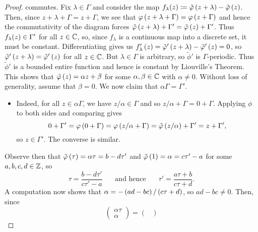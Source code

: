 \documentclass[../Moduli_Spaces_of_Riemann_Surfaces.tex]{subfiles}
\begin{document}
\begin{proof}
        commutes. Fix $\lambda\in\Gamma$ and consider the map $f_\lambda\!\left(z\right)\coloneqq\tilde{\varphi}\left(z+\lambda\right)-\tilde{\varphi}\left(z\right)$. Then, since $z+\lambda+\Gamma=z+\Gamma$, we see that $\varphi\left(z+\lambda+\Gamma\right)=\varphi\left(z+\Gamma\right)$ and hence the commutativity of the diagram forces $\tilde{\varphi}\left(z+\lambda\right)+\Gamma'=\tilde{\varphi}\left(z\right)+\Gamma'$. Thus $f_\lambda\!\left(z\right)\in\Gamma'$ for all $z\in\mathbb{C}$, so, since $f_\lambda$ is a continuous map into a discrete set, it must be constant. Differentiating gives us $f_\lambda'\left(z\right)=\tilde{\varphi}'\left(z+\lambda\right)-\tilde{\varphi}'\left(z\right)=0$, so $\tilde{\varphi}'\left(z+\lambda\right)=\tilde{\varphi}'\left(z\right)$ for all $z\in\mathbb{C}$. But $\lambda\in\Gamma$ is arbitrary, so $\tilde{\phi}'$ is $\Gamma$-periodic. Thus $\tilde{\phi}'$ is a bounded entire function and hence is constant by Liouville's Theorem. This shows that $\tilde{\varphi}\left(z\right)=\alpha z+\beta$ for some $\alpha,\beta\in\mathbb{C}$ with $\alpha\neq0$. Without loss of generality, assume that $\beta=0$. We now claim that $\alpha\Gamma=\Gamma'$.
        \begin{itemize}
            \item Indeed, for all $z\in\alpha\Gamma$, we have $z/\alpha\in\Gamma$ and so $z/\alpha+\Gamma=0+\Gamma$. Applying $\phi$ to both sides and comparing gives
                \begin{equation*}
                    0+\Gamma'=\varphi\left(0+\Gamma\right)=\varphi\left(z/\alpha+\Gamma\right)=\tilde{\varphi}\left(z/\alpha\right)+\Gamma'=z+\Gamma',
                \end{equation*}
                so $z\in\Gamma'$. The converse is similar.
        \end{itemize}
        Observe then that $\tilde{\varphi}\left(\tau\right)=\alpha\tau=b-d\tau'$ and $\tilde{\varphi}\left(1\right)=\alpha=c\tau'-a$ for some $a,b,c,d\in\mathbb{Z}$, so
        \begin{equation*}
            \tau=\frac{b-d\tau'}{c\tau'-a}\ \ \ \ \ \ \ \ \textrm{and hence}\ \ \ \ \ \ \ \ \tau'=\frac{a\tau+b}{c\tau+d}.
        \end{equation*}
        A computation now shows that $\alpha=-\left(ad-bc\right)/\left(c\tau+d\right)$, so $ad-bc\neq0$. Then, since
        \begin{equation*}
            \begin{pmatrix}
                \alpha\tau \\ \alpha
            \end{pmatrix}=
            \begin{pmatrix}

\end{pmatrix}
\end{equation*}
\end{proof}
\end{document}
